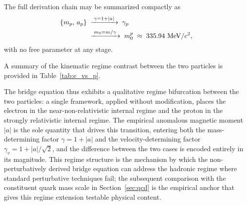 \documentclass[%
 reprint, amsmath,amssymb, aps, prc, ]{revtex4-2}
\numberwithin{equation}{section}
\begin{document}
The full derivation chain may be summarized compactly as
\begin{align}
\{m_p,\, a_p\}
&\;\xrightarrow{\;\gamma = 1+|a|\;}\; \gamma_p
\notag\\
&\;\xrightarrow{\;m_0 = m/\gamma\;}\; m_0^p \;\approx\; 335.94 \text{ MeV}/c^2,
\label{eq:derivation-chain}
\end{align}
with no free parameter at any stage.

A summary of the kinematic regime contrast between the two particles is provided in Table~\ref{tab:e_vs_p}.

The bridge equation thus exhibits a qualitative regime bifurcation between the two particles: a single framework, applied without modification, places the electron in the near-non-relativistic internal regime and the proton in the strongly relativistic internal regime. The empirical anomalous magnetic moment $|a|$ is the sole quantity that drives this transition, entering both the mass-determining factor $\gamma = 1+|a|$ and the velocity-determining factor $\gamma_v = 1+|a|/\sqrt{2}$, and the difference between the two cases is encoded entirely in its magnitude. This regime structure is the mechanism by which the non-perturbatively derived bridge equation can address the hadronic regime where standard perturbative techniques fail; the subsequent comparison with the constituent quark mass scale in Section~\ref{sec:qcd} is the empirical anchor that gives this regime extension testable physical content.
\end{document}
